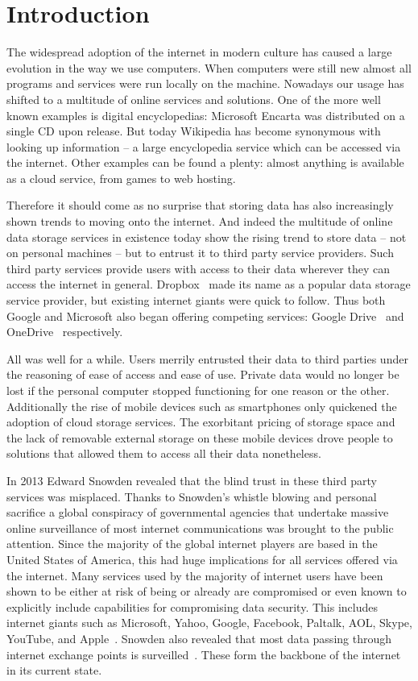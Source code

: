\chapter{Introduction}
\label{chap:Introduction}

The widespread adoption of the internet in modern culture has caused a large evolution in the way we use computers.
When computers were still new almost all programs and services were run locally on the machine.
Nowadays our usage has shifted to a multitude of online services and solutions.
One of the more well known examples is digital encyclopedias: Microsoft Encarta was distributed on a single CD upon release.
But today Wikipedia has become synonymous with looking up information --  a large encyclopedia service which can be accessed via the internet.
Other examples can be found a plenty: almost anything is available as a cloud service, from games to web hosting.

Therefore it should come as no surprise that storing data has also increasingly shown trends to moving onto the internet.
And indeed the multitude of online data storage services in existence today show the rising trend to store data -- not on personal machines -- but to entrust it to third party service providers.
Such third party services provide users with access to their data wherever they can access the internet in general.
Dropbox~\cite{web:site:dropbox} made its name as a popular data storage service provider, but existing internet giants were quick to follow.
Thus both Google and Microsoft also began offering competing services: Google Drive~\cite{web:site:gdrive} and OneDrive~\cite{web:site:onedrive} respectively.

All was well for a while.
Users merrily entrusted their data to third parties under the reasoning of ease of access and ease of use.
Private data would no longer be lost if the personal computer stopped functioning for one reason or the other.
Additionally the rise of mobile devices such as smartphones only quickened the adoption of cloud storage services.
The exorbitant pricing of storage space and the lack of removable external storage on these mobile devices drove people to solutions that allowed them to access all their data nonetheless.

In 2013 Edward Snowden revealed that the blind trust in these third party services was misplaced.
Thanks to Snowden's whistle blowing and personal sacrifice a global conspiracy of governmental agencies that undertake massive online surveillance of most internet communications was brought to the public attention.
Since the majority of the global internet players are based in the United States of America, this had huge implications for all services offered via the internet.
Many services used by the majority of internet users have been shown to be either at risk of being or already are compromised or even known to explicitly include capabilities for compromising data security.
This includes internet giants such as Microsoft, Yahoo, Google, Facebook, Paltalk, AOL, Skype, YouTube, and Apple~\cite{web:site:wp:internet_giants}.
Snowden also revealed that most data passing through internet exchange points is surveilled~\cite{web:site:heise:decix}.
These form the backbone of the internet in its current state.

